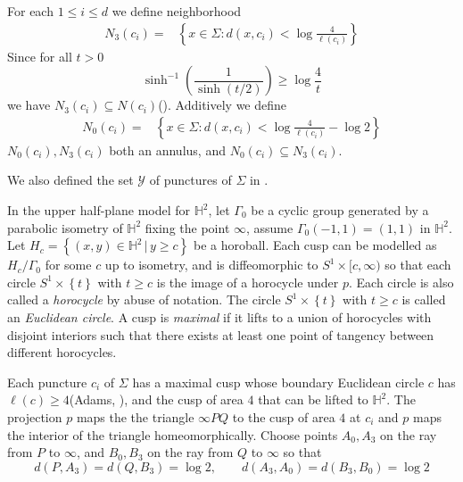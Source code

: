 \documentclass[11pt, a4paper]{article}
\theoremstyle{definition}
\theoremstyle{remark}
\newcommand{\bbh}{\mathbb{H}}
\newcommand{\caly}{\mathcal{Y}}
\newcommand{\set}[1]{\left\{ #1 \right\}}
\newcommand{\bracket}[1]{\left( #1 \right)}
\begin{document}
For each $1\leqslant{i}\leqslant{d}$ we define neighborhood
\begin{equation}\begin{aligned}
N_3(c_i)=&\set{x\in{\Sigma}:d(x,c_i)<{\log{\frac{4}{\ell(c_i)}}}}
\end{aligned}\end{equation}
Since for all $t>0$
$$\sinh^{-1}\bracket{\frac1{\sinh(t/2)}}\geqslant\log\frac4{t}$$
we have $N_3(c_i)\subseteq N(c_i)$(\cite[Lemma 2.1]{Y2800}). Additively we define
\begin{equation}\begin{aligned}
N_0(c_i)=&\set{x\in{\Sigma}:d(x,c_i)<{\log{\frac{4}{\ell(c_i)}}-\log2}}
\end{aligned}\end{equation}
$N_0(c_i),N_3(c_i)$ both an annulus, and $N_0(c_i)\subseteq N_3(c_i)$.

We also defined the set $\caly$ of punctures of $\Sigma$ in \cite{Y2800}.

In the upper half-plane model for $\bbh^2$, let $\Gamma_0$ be a cyclic group generated by a parabolic isometry of $\bbh^2$ fixing the point $\infty$, assume $\Gamma_0(-1,1)=(1,1)$ in $\bbh^2$. Let $H_c=\set{(x,y)\in\bbh^2\,\big|\,y\geqslant c}$ be a horoball. Each cusp can be modelled as $H_c/\Gamma_0$ for some $c$ up to isometry, and is diffeomorphic to $S^1\times[c,\infty)$ so that each circle $S^1\times\set{t}$ with $t\geqslant c$ is the image of a horocycle under $p$. Each circle is also called a \emph{horocycle} by abuse of notation. The circle $S^1\times\set{t}$ with $t\geqslant c$ is called an \emph{Euclidean circle}. A cusp is \emph{maximal} if it lifts to a union of horocycles with disjoint interiors such that there exists at least one point of tangency between different horocycles.



 Each puncture $c_i$ of $\Sigma$ has a maximal cusp whose boundary Euclidean circle $c$ has %
$\ell(c)\geqslant4$(Adams, \cite{A2817}), and the cusp of area $4$ that can be lifted to $\bbh^2$.
The projection $p$ maps the the triangle $\infty PQ$ to the cusp of area $4$ at $c_i$ and $p$ maps the interior of the triangle homeomorphically. Choose points $A_0, A_3$ on the ray from $P$ to $\infty$, and $B_0, B_3$ on the ray from $Q$ to $\infty$ so that
$$d(P,A_3)=d(Q,B_3)=\log2,\qquad d(A_3,A_0)=d(B_3,B_0)=\log2$$
 
\end{document}
